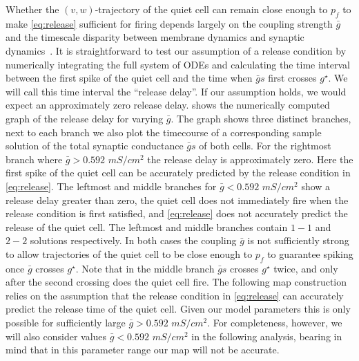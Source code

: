 \documentclass[utf8]{frontiersFPHY} %
\newcommand{\gbar}{\bar g}
\begin{document}
Whether the $(v,w)$-trajectory of the quiet cell can remain close enough to $p_{f}$ to make \cref{eq:release} sufficient for firing depends largely on the coupling strength $\gbar$ and the timescale disparity between membrane dynamics and synaptic dynamics~\citep{bose2011}.
It is straightforward to test our assumption of a release condition by numerically integrating the full system of ODEs and calculating the time interval between the first spike of the quiet cell and the time when $\gbar s$ first crosses $g^{\star}$.
We will call this time interval the ``release delay''.
If our assumption holds, we would expect an approximately zero release delay.
 shows the numerically computed graph of the release delay for varying $\gbar$.
The graph shows three distinct branches, next to each branch we also plot the timecourse of a corresponding sample solution of the total synaptic conductance $\gbar s$ of both cells.
For the rightmost branch where $\gbar>0.592$ $\si{mS/cm^{2}}$ the release delay is approximately zero.
Here the first spike of the quiet cell can be accurately predicted by the release condition in \cref{eq:release}.
The leftmost and middle branches for $\gbar<0.592$ $\si{mS/cm^{2}}$  show a release delay greater than zero, the quiet cell does not immediately fire when the release condition is first satisfied, and \cref{eq:release} does not accurately predict the release of the quiet cell.
The leftmost and middle branches contain $1-1$ and $2-2$ solutions respectively.
In both cases the coupling $\gbar$ is not sufficiently strong to allow trajectories of the quiet cell to be close enough to $p_{f}$ to guarantee spiking once $\gbar$ crosses $g^{\star}$.
Note that in the middle branch $\gbar s $ crosses $g^{\star}$ twice, and only after the second crossing does the quiet cell fire.
The following map construction relies on the assumption that the release condition in \cref{eq:release} can accurately predict the release time of the quiet cell.
Given our model parameters this is only possible for sufficiently large $\gbar>0.592 $ $\si{mS/cm^{2}}$.
For completeness, however, we will also consider values $\gbar < 0.592$ $\si{mS/cm^{2}}$ in the following analysis, bearing in mind that in this parameter range our map will not be accurate.
\end{document}
